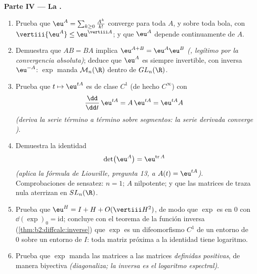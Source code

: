 \begin{problem}
\medskip
\noindent\textbf{Parte IV --- La .}
\begin{enumerate}[resume]
  \item Prueba que $\eu^A = \sum_{k\geq0}\frac{A^k}{k!}$ converge
         para toda $A$, y  sobre toda bola,
        con $\vertiii{\eu^A} \leq \eu^{\vertiii A}$; y que $\eu^A$
        depende continuamente de $A$.
  \item Demuestra que $AB = BA$ implica $\eu^{A+B} = \eu^A\eu^B$
        \emph{(, legítimo por la convergencia
        absoluta)}; deduce que $\eu^A$ es siempre invertible, con
        inversa $\eu^{-A}$: $\exp$ manda $\mathcal M_n(\R)$ dentro de
        $GL_n(\R)$.
  \item Prueba que $t \mapsto \eu^{tA}$ es de clase $C^1$ (de hecho
        $C^\infty$) con
        \[
        \frac{\dd}{\dd t}\,\eu^{tA} = A\,\eu^{tA} =
        \eu^{tA}A
        \]
        \emph{(deriva la serie término a término sobre segmentos: la
        serie derivada converge )}.
  \item Demuestra la identidad
        \[
        \det\bigl(\eu^{A}\bigr) = \eu^{\operatorname{tr}A}
        \]
        \emph{(aplica la fórmula de Liouville, pregunta 13, a $A(t) =
        \eu^{tA}$)}. Comprobaciones de sensatez: $n = 1$; $A$
        nilpotente; y que las matrices de traza nula aterrizan en
        $SL_n(\R)$.
  \item Prueba que $\eu^H = I + H + O(\vertiii H^2)$, de modo que
        $\exp$ es  en $0$ con $\dd(\exp)_0 =
        \mathrm{id}$; concluye con el teorema de la función inversa
        (\cref{thm:b2:diffcalc:inverse}) que $\exp$ es un
        difeomorfismo $C^1$ de un entorno de $0$ sobre un entorno de
        $I$: toda matriz próxima a la identidad tiene logaritmo.
  \item Prueba que $\exp$ manda las matrices  a las
        matrices  \emph{definidas positivas}, de manera
        biyectiva \emph{(diagonaliza; la inversa es el logaritmo
        espectral)}.
\end{enumerate}


\end{problem}
